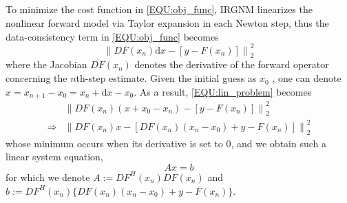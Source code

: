 \documentclass[journal,twoside,web]{ieeecolor}
\newcommand*{\norm}[1]{\left\lVert#1\right\rVert}
\begin{document}
\begin{appendices}


\section{}
\label{SEC:APPENDIXA}

\setcounter{equation}{0}
\renewcommand{\theequation}{A.\arabic{equation}}

\noindent To minimize the cost function in \cref{EQU:obj_func}, 
IRGNM linearizes the nonlinear forward model via Taylor expansion in each Newton step, 
thus the data-consistency term in \cref{EQU:obj_func} becomes
\begin{equation} \label{EQU:lin_problem}
\norm{DF(x_n) \text{d} x - [ y - F(x_n) ] }_2^2
\end{equation}
where the Jacobian $DF(x_n)$ denotes the derivative of the forward operator 
concerning the $n$th-step estimate. 
Given the initial guess as $x_0$ \cite{uecker_2008_nlinv}, 
one can denote $x = x_{n+1} - x_0 = x_{n} + \text{d} x - x_0$. 
As a result, \cref{EQU:lin_problem} becomes
\begin{equation}
\begin{aligned}
&\norm{DF(x_n) (x + x_0 - x_n) - [ y - F(x_n) ] }_2^2 \\
\Rightarrow &\norm{DF(x_n) x -[ DF(x_n) (x_n - x_0) +  y - F(x_n) ] }_2^2
\end{aligned}
\end{equation}
whose minimum occurs when its derivative is set to $0$, and we obtain such a linear system equation,
\begin{equation} \label{EQU:lsqr}
A x = b
\end{equation}
for which we denote $A := DF^H (x_n) DF(x_n)$ and $b := DF^H (x_n) \big\{ DF(x_n) (x_n - x_0) +  y - F(x_n) \big\}$.


\end{appendices}
\end{document}
